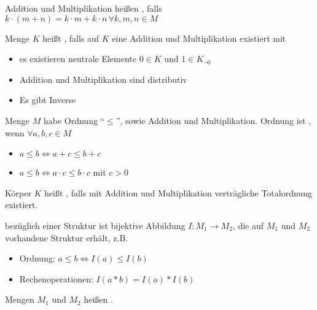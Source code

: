 \begin{*definition}[distributiv]
	Addition und Multiplikation heißen , falls $k\cdot(m+n) = k\cdot m + k\cdot n\,\forall k,m,n\in M$
\end{*definition}

\begin{*definition}[Körper]
	Menge $K$ heißt , falls auf $K$ eine Addition und Multiplikation existiert mit
	\begin{itemize}
		\item es existieren neutrale Elemente $0\in K$ und $1\in K_{\neg 0}$
		\item Addition und Multiplikation sind distributiv
		\item Es gibt Inverse
	\end{itemize}
\end{*definition}

\begin{*definition}
	Menge $M$ habe Ordnung "`$\le$"', sowie Addition und Multiplikation.
	Ordnung ist , wenn $\forall a,b,c\in M$
	\begin{itemize}
		\item $a\le b \Leftrightarrow a+c \le b+c$
		\item $a\le b \Leftrightarrow a\cdot c \le b\cdot c$ mit $c > 0$
	\end{itemize}
\end{*definition}

\begin{*definition}[angeordnet]
	Körper $K$ heißt , falls mit Addition und Multiplikation verträgliche Totalordnung existiert.
\end{*definition}

\begin{*definition}[Isomorphismus]
	 bezüglich einer Struktur ist bijektive Abbildung $I:M_1\rightarrow M_2$, die auf $M_1$ und $M_2$ vorhandene Struktur erhält, z.B. 
	\begin{itemize}
		\item Ordnung: $a\le b\iff I(a)\le I(b)$
		\item Rechenoperationen: $I(a*b)=I(a)*I(b)$
	\end{itemize}
	Mengen $M_1$ und $M_2$ heißen .
\end{*definition}

